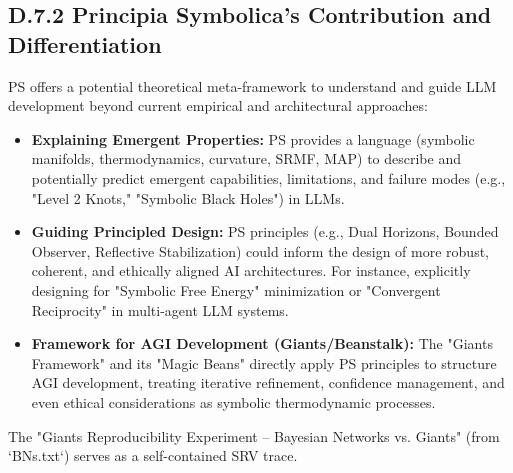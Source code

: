 \subsection*{D.7.2 Principia Symbolica's Contribution and Differentiation} \label{subsec:appD_ai_contribution_differentiation}
PS offers a potential theoretical meta-framework to understand and guide LLM development beyond current empirical and architectural approaches:
\begin{itemize}
    \item \textbf{Explaining Emergent Properties:} PS provides a language (symbolic manifolds, thermodynamics, curvature, SRMF, MAP) to describe and potentially predict emergent capabilities, limitations, and failure modes (e.g., "Level 2 Knots," "Symbolic Black Holes") in LLMs.
    \item \textbf{Guiding Principled Design:} PS principles (e.g., Dual Horizons, Bounded Observer, Reflective Stabilization) could inform the design of more robust, coherent, and ethically aligned AI architectures. For instance, explicitly designing for "Symbolic Free Energy" minimization or "Convergent Reciprocity" in multi-agent LLM systems.
    \item \textbf{Framework for AGI Development (Giants/Beanstalk):} The "Giants Framework" and its "Magic Beans" directly apply PS principles to structure AGI development, treating iterative refinement, confidence management, and even ethical considerations as symbolic thermodynamic processes.
\end{itemize}
The "Giants Reproducibility Experiment – Bayesian Networks vs. Giants" (from `BNs.txt`) serves as a self-contained SRV trace.
